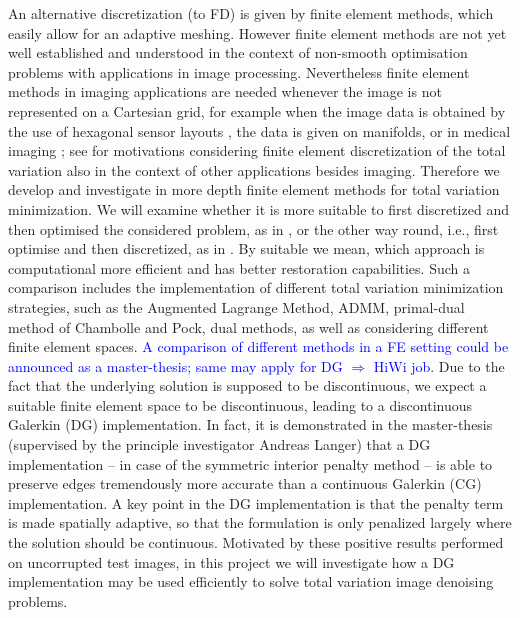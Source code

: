 \documentclass[enabledeprecatedfontcommands,cleardoublepage=empty,headsepline,twoside,11pt,DIV=15,BCOR=12mm,final]{scrartcl}
\begin{document}
 An alternative discretization (to FD) is given by finite element methods, which easily allow for an adaptive meshing. However finite element methods are not yet well established and understood in the context of non-smooth optimisation problems with applications in image processing. Nevertheless finite element methods in imaging applications are needed whenever the image is not represented on a Cartesian grid, for example when the image data is obtained by the use of hexagonal sensor layouts \cite{}, the data is given on manifolds, or in medical imaging \cite{}; see \cite{} for motivations considering finite element discretization of the total variation also in the context of other applications besides imaging.  
  Therefore we develop and investigate in more depth finite element methods for total variation minimization. We will examine whether it is more suitable to first discretized and then optimised the considered problem, as in \cite{Herzog etal}, or the other way round, i.e., first optimise and then discretized, as in \cite{AlkLan}. By suitable we mean, which approach is computational more efficient and has better restoration capabilities. %
  Such a comparison includes the implementation of different total variation minimization strategies, such as the Augmented Lagrange Method, ADMM, primal-dual method of Chambolle and Pock, dual methods, as well as considering different finite element spaces. \textcolor{blue}{A comparison of different methods in a FE setting could be announced as a master-thesis; same may apply for DG $\Rightarrow$ HiWi job.} Due to the fact that the underlying solution is supposed to be discontinuous, we expect a suitable finite element space to be discontinuous, leading to a discontinuous Galerkin (DG) implementation. In fact, it is demonstrated in the master-thesis \cite{Dieterich} (supervised by the principle investigator Andreas Langer) that a DG implementation -- in case of the symmetric interior penalty method -- is able to preserve edges tremendously more accurate than a continuous Galerkin (CG) implementation. A key point in the DG implementation is that the penalty term is made spatially adaptive, so that the formulation is only penalized largely where the solution should be continuous. Motivated by these positive results performed on uncorrupted test images, in this project we will investigate how a DG implementation may be used efficiently to solve total variation image denoising problems. 
  
\end{document}
